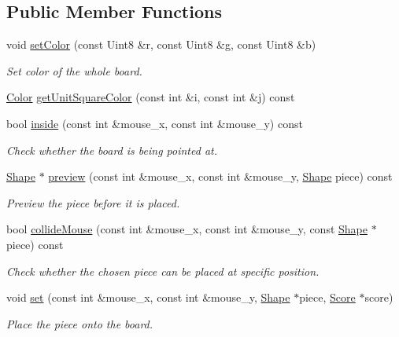 \subsection*{Public Member Functions}
\begin{DoxyCompactItemize}
\item 
void \mbox{\hyperlink{class_board_a97bd56f18a0b5820cb246068df0430c1}{set\+Color}} (const Uint8 \&r, const Uint8 \&g, const Uint8 \&b)
\begin{DoxyCompactList}\small\item\em Set color of the whole board. \end{DoxyCompactList}\item 
\mbox{\hyperlink{class_color}{Color}} \mbox{\hyperlink{class_board_a00ea631b424b3b7539d19cd0b9403c35}{get\+Unit\+Square\+Color}} (const int \&i, const int \&j) const
\item 
bool \mbox{\hyperlink{class_board_a1e345139edce45ab583780bd425a6fc3}{inside}} (const int \&mouse\+\_\+x, const int \&mouse\+\_\+y) const
\begin{DoxyCompactList}\small\item\em Check whether the board is being pointed at. \end{DoxyCompactList}\item 
\mbox{\hyperlink{class_shape}{Shape}} $\ast$ \mbox{\hyperlink{class_board_ad1e07505d653391e9c0f474e198bec1b}{preview}} (const int \&mouse\+\_\+x, const int \&mouse\+\_\+y, \mbox{\hyperlink{class_shape}{Shape}} piece) const
\begin{DoxyCompactList}\small\item\em Preview the piece before it is placed. \end{DoxyCompactList}\item 
bool \mbox{\hyperlink{class_board_aae2c049c36cbe5f07a1e9154a6a6932e}{collide\+Mouse}} (const int \&mouse\+\_\+x, const int \&mouse\+\_\+y, const \mbox{\hyperlink{class_shape}{Shape}} $\ast$piece) const
\begin{DoxyCompactList}\small\item\em Check whether the chosen piece can be placed at specific position. \end{DoxyCompactList}\item 
void \mbox{\hyperlink{class_board_a4e818e1e582bd7018353698cd2219dfd}{set}} (const int \&mouse\+\_\+x, const int \&mouse\+\_\+y, \mbox{\hyperlink{class_shape}{Shape}} $\ast$piece, \mbox{\hyperlink{class_score}{Score}} $\ast$score)
\begin{DoxyCompactList}\small\item\em Place the piece onto the board. \end{DoxyCompactList}\item 

\end{DoxyCompactItemize}
